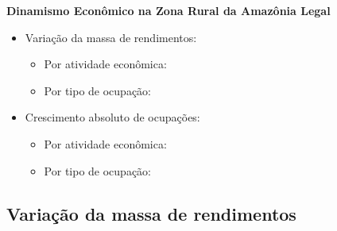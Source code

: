 \documentclass[8pt]{beamer}
\begin{document}
\begin{frame}[label=indice_principal_amz_rural]{}

\textit{\hyperlink{indice_principal}{}}

\textbf{Dinamismo Econômico na Zona Rural da Amazônia Legal}
\vspace{2mm}

\begin{itemize}

\item{Variação da massa de rendimentos:
	\begin{itemize}
	\item{Por atividade econômica: \hyperlink{amzruralrkngvmassaporcnae2dig}{}}
	\item{Por tipo de ocupação: \hyperlink{amzruralrkngvmassaporcod2dig}{}}
	\end{itemize}
}
\vspace{1mm}

\item{Crescimento  absoluto de ocupações:
	\begin{itemize}
	\item{Por atividade econômica: \hyperlink{amzruralrkngnocuporcnae2dig}{}}
	\item{Por tipo de ocupação: \hyperlink{amzruralrkngnocuporcod2dig}{}}
	\end{itemize}
}
\vspace{1mm}

\end{itemize}

\end{frame}


\subsection{Variação da massa de rendimentos}

\begin{frame}
\textit{\hyperlink{indice_principal_amz_rural}{}}

\end{frame}

\begin{frame}
\textit{\hyperlink{indice_principal_amz_rural}{}}

\end{frame}
\end{document}
